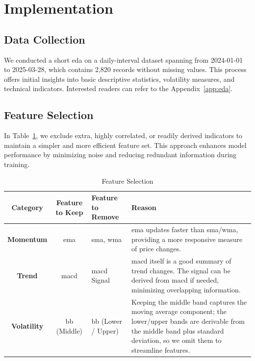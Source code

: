 \clearpage
\section{Implementation}

\subsection{Data Collection}

We conducted a short \acrfull{eda} on a daily-interval dataset spanning 
from 2024-01-01 to 2025-03-28, which contains 2,820 records without missing values.
This process offers initial insights into basic descriptive statistics, volatility measures,
and technical indicators. Interested readers can refer to the Appendix~\ref{app:eda}.

\subsection{Feature Selection}

In Table~\ref{tab:feature_selection}, we exclude extra, highly correlated, or readily derived
indicators to maintain a simpler and more efficient feature set. This approach enhances model
performance by minimizing noise and reducing redundant information during training.

\begin{table}[H]
\centering
\caption{Feature Selection}
\label{tab:feature_selection}
\begin{tabular}{ccp{2cm}p{6cm}}
\hline
\textbf{Category} & \textbf{Feature to Keep} & \textbf{Feature to Remove} & \textbf{Reason} \\
\hline\hline
\textbf{Momentum}  & \acrshort{ema} & \acrshort{sma}, \acrshort{wma} & 
\acrshort{ema} updates faster than \acrshort{sma}/\acrshort{wma}, providing a more 
responsive measure of price changes.\\
\textbf{Trend}     & \acrshort{macd} & \acrshort{macd} Signal & 
\acrshort{macd} itself is a good summary of trend changes. The signal can be
derived from \acrshort{macd} if needed, minimizing overlapping information. \\
\textbf{Volatility} & \acrshort{bb} (Middle) & \acrshort{bb} (Lower / Upper) & Keeping the 
middle band captures the moving average component; the lower/upper bands are derivable from the
middle band plus standard deviation, so we omit them to streamline features.\\
\hline
\end{tabular}
\end{table}

